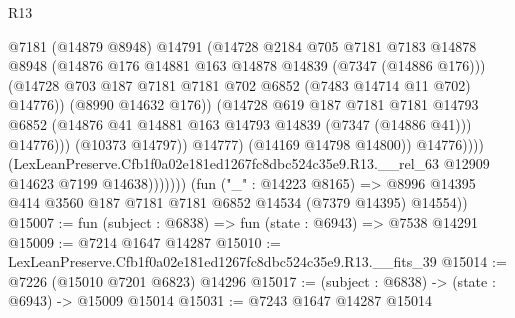 \begin{lexlean}{R13}
\begin{coremodule}
                                      @7181
                                      (@14879 @8948)
                                      @14791
                                      (@14728
                                        @2184
                                        @705
                                        @7181
                                        @7183
                                        @14878
                                        @8948
                                        (@14876
                                          @176
                                          @14881
                                          @163
                                          @14878
                                          @14839
                                          (@7347 (@14886 @176)))
                                        (@14728
                                          @703
                                          @187
                                          @7181
                                          @7181
                                          @702
                                          @6852
                                          (@7483 @14714 @11 @702)
                                          @14776))
                                      (@8990 @14632 @176))
                                    (@14728
                                      @619
                                      @187
                                      @7181
                                      @7181
                                      @14793
                                      @6852
                                      (@14876 @41 @14881 @163 @14793 @14839 (@7347 (@14886 @41)))
                                      @14776)))
                                (@10373 @14797))
                              @14777)
                            (@14169 @14798 @14800))
                          @14776))))
                  (LexLeanPreserve.Cfb1f0a02e181ed1267fc8dbc524c35e9.R13.__rel_63
                    @12909
                    @14623
                    @7199
                    @14638)))))))
      (fun ("_" : @14223 @8165) =>
      @8996 @14395 @414 @3560 @187 @7181 @7181 @6852 @14534 (@7379 @14395) @14554))
@15007 := fun (subject : @6838) => fun (state : @6943) => @7538 @14291
@15009 := @7214 @1647 @14287
@15010 := LexLeanPreserve.Cfb1f0a02e181ed1267fc8dbc524c35e9.R13.__fits_39
@15014 := @7226 (@15010 @7201 @6823) @14296
@15017 := (subject : @6838) -> (state : @6943) -> @15009 @15014
@15031 := @7243
    @1647
    @14287
    @15014

\end{coremodule}
\end{lexlean}
